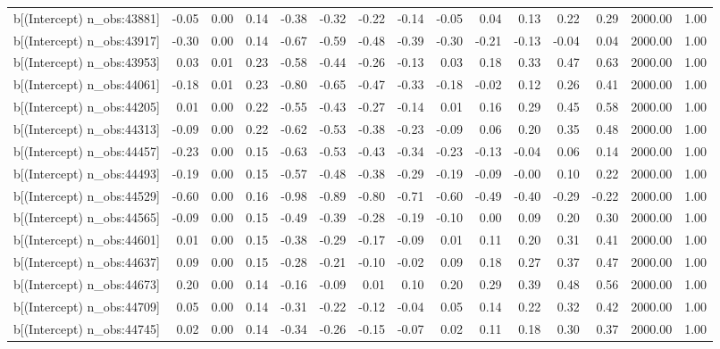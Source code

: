 \begin{table}[ht]
\begin{tabular}{rrrrrrrrrrrrrrr}
  b[(Intercept) n\_obs:43881] & -0.05 & 0.00 & 0.14 & -0.38 & -0.32 & -0.22 & -0.14 & -0.05 & 0.04 & 0.13 & 0.22 & 0.29 & 2000.00 & 1.00 \\ 
  b[(Intercept) n\_obs:43917] & -0.30 & 0.00 & 0.14 & -0.67 & -0.59 & -0.48 & -0.39 & -0.30 & -0.21 & -0.13 & -0.04 & 0.04 & 2000.00 & 1.00 \\ 
  b[(Intercept) n\_obs:43953] & 0.03 & 0.01 & 0.23 & -0.58 & -0.44 & -0.26 & -0.13 & 0.03 & 0.18 & 0.33 & 0.47 & 0.63 & 2000.00 & 1.00 \\ 
  b[(Intercept) n\_obs:44061] & -0.18 & 0.01 & 0.23 & -0.80 & -0.65 & -0.47 & -0.33 & -0.18 & -0.02 & 0.12 & 0.26 & 0.41 & 2000.00 & 1.00 \\ 
  b[(Intercept) n\_obs:44205] & 0.01 & 0.00 & 0.22 & -0.55 & -0.43 & -0.27 & -0.14 & 0.01 & 0.16 & 0.29 & 0.45 & 0.58 & 2000.00 & 1.00 \\ 
  b[(Intercept) n\_obs:44313] & -0.09 & 0.00 & 0.22 & -0.62 & -0.53 & -0.38 & -0.23 & -0.09 & 0.06 & 0.20 & 0.35 & 0.48 & 2000.00 & 1.00 \\ 
  b[(Intercept) n\_obs:44457] & -0.23 & 0.00 & 0.15 & -0.63 & -0.53 & -0.43 & -0.34 & -0.23 & -0.13 & -0.04 & 0.06 & 0.14 & 2000.00 & 1.00 \\ 
  b[(Intercept) n\_obs:44493] & -0.19 & 0.00 & 0.15 & -0.57 & -0.48 & -0.38 & -0.29 & -0.19 & -0.09 & -0.00 & 0.10 & 0.22 & 2000.00 & 1.00 \\ 
  b[(Intercept) n\_obs:44529] & -0.60 & 0.00 & 0.16 & -0.98 & -0.89 & -0.80 & -0.71 & -0.60 & -0.49 & -0.40 & -0.29 & -0.22 & 2000.00 & 1.00 \\ 
  b[(Intercept) n\_obs:44565] & -0.09 & 0.00 & 0.15 & -0.49 & -0.39 & -0.28 & -0.19 & -0.10 & 0.00 & 0.09 & 0.20 & 0.30 & 2000.00 & 1.00 \\ 
  b[(Intercept) n\_obs:44601] & 0.01 & 0.00 & 0.15 & -0.38 & -0.29 & -0.17 & -0.09 & 0.01 & 0.11 & 0.20 & 0.31 & 0.41 & 2000.00 & 1.00 \\ 
  b[(Intercept) n\_obs:44637] & 0.09 & 0.00 & 0.15 & -0.28 & -0.21 & -0.10 & -0.02 & 0.09 & 0.18 & 0.27 & 0.37 & 0.47 & 2000.00 & 1.00 \\ 
  b[(Intercept) n\_obs:44673] & 0.20 & 0.00 & 0.14 & -0.16 & -0.09 & 0.01 & 0.10 & 0.20 & 0.29 & 0.39 & 0.48 & 0.56 & 2000.00 & 1.00 \\ 
  b[(Intercept) n\_obs:44709] & 0.05 & 0.00 & 0.14 & -0.31 & -0.22 & -0.12 & -0.04 & 0.05 & 0.14 & 0.22 & 0.32 & 0.42 & 2000.00 & 1.00 \\ 
  b[(Intercept) n\_obs:44745] & 0.02 & 0.00 & 0.14 & -0.34 & -0.26 & -0.15 & -0.07 & 0.02 & 0.11 & 0.18 & 0.30 & 0.37 & 2000.00 & 1.00 \\ 

\end{tabular}
\end{table}
